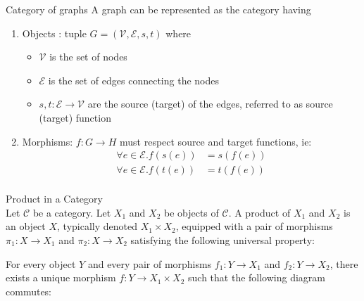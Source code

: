 \begin{example}{Category of graphs}
	A graph can be represented as the category having
	\begin{enumerate}
		\item Objects : tuple $G = (\mathcal{V},\mathcal{E},s,t)$ where
		\begin{itemize}
			\item $\mathcal{V}$ is the set of nodes
			\item $\mathcal{E}$ is the set of edges connecting the nodes
			\item $s, t : \mathcal{E}\rightarrow\mathcal{V}$ are the source (target) of the edges, referred to as source (target) function
		\end{itemize}
		\item Morphisms: $f : G \rightarrow H$ must respect source and target functions, ie:
		\begin{align*}
			\forall e \in \mathcal{E}.f(s(e)) &= s(f(e))\\
			\forall e \in \mathcal{E}.f(t(e)) &= t(f(e))\\
		\end{align*}
	\end{enumerate}
\end{example}


\begin{definition}{Product in a Category}\\
	Let $\mathcal{C}$ be a category. Let $X_1$ and $X_2$ be objects of $\mathcal{C}$. A product of $X_1$ and $X_2$ is an object $X$, typically denoted $X_1 \times X_2$, equipped with a pair of morphisms $\pi_1: X \to X_1$ and $\pi_2: X \to X_2$ satisfying the following universal property:
	
	For every object $Y$ and every pair of morphisms $f_1: Y \to X_1$ and $f_2: Y \to X_2$, there exists a unique morphism $f: Y \to X_1 \times X_2$ such that the following diagram commutes:
	
	\begin{center}
	\end{center}
\end{definition}


